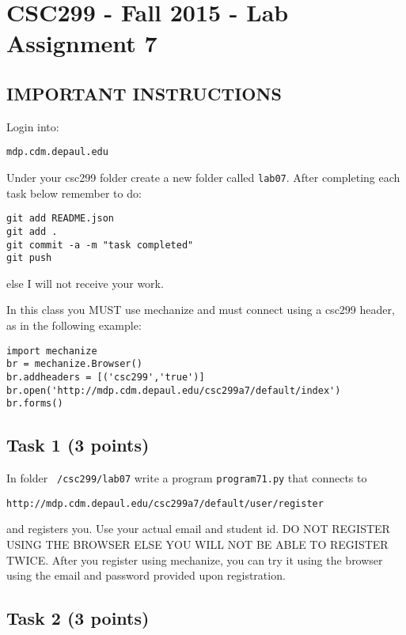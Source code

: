 \documentclass[12pt]{article}
\begin{document}
\section{CSC299 - Fall 2015 - Lab Assignment 7}

\subsection*{IMPORTANT INSTRUCTIONS}

\noindent Login into:
\begin{verbatim}
mdp.cdm.depaul.edu
\end{verbatim}

\noindent Under your csc299 folder create a new folder called {\tt lab07}.
\noindent After completing each task below remember to do:

\begin{verbatim}
git add README.json
git add .
git commit -a -m "task completed"
git push
\end{verbatim}

\noindent  else I will not receive your work.

\noindent In this class you MUST use mechanize and must connect using a csc299 header, as in the following example:

\begin{verbatim}
import mechanize
br = mechanize.Browser()
br.addheaders = [('csc299','true')]
br.open('http://mdp.cdm.depaul.edu/csc299a7/default/index')
br.forms()
\end{verbatim}

\subsection{Task 1 (3 points)}

\noindent  In folder {\tt ~/csc299/lab07} write a program {\tt program71.py} that connects to 

\begin{verbatim}
http://mdp.cdm.depaul.edu/csc299a7/default/user/register
\end{verbatim}

and registers you. Use your actual email and student id.
DO NOT REGISTER USING THE BROWSER ELSE YOU WILL NOT BE ABLE TO REGISTER TWICE.
After you register using mechanize, you can try it using the browser using the email and password provided upon registration.

\subsection{Task 2 (3 points)}
\end{document}

